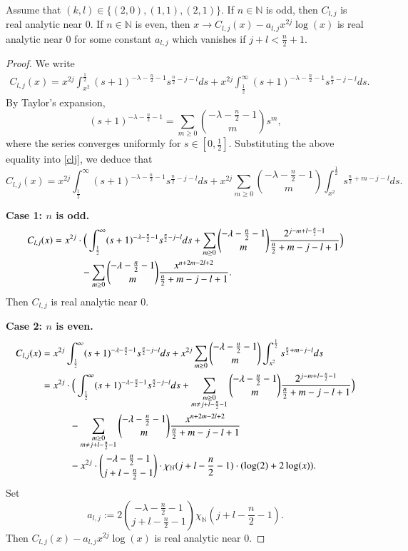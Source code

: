 \documentclass[12pt]{amsart}
\begin{document}
\begin{lemma}\label{third fkl lemma} Assume that $(k,l)\in\{(2,0),(1,1),(2,1)\}$. If $n\in\mathbb{N}$ is odd, then $C_{l,j}$ is real analytic near $0.$ If $n\in\mathbb{N}$ is even, then $x\to C_{l,j}(x)-a_{l,j}x^{2j}\log(x)$ is real analytic near $0$ for some constant $a_{l,j}$ which vanishes if $j+l<\frac{n}{2}+1.$
\end{lemma}
\begin{proof} We write
\begin{align}\label{clj}
C_{l,j}(x)=x^{2j}\int_{x^2}^{\frac12}(s+1)^{-\lambda-\frac{n}{2}-1}s^{\frac{n}{2}-j-l}ds+x^{2j}\int_{\frac12}^{\infty}(s+1)^{-\lambda-\frac{n}{2}-1}s^{\frac{n}{2}-j-l}ds.
\end{align}
By Taylor's expansion,
$$(s+1)^{-\lambda-\frac{n}{2}-1}=\sum_{m\geq0}\binom{-\lambda-\frac{n}{2}-1}{m}s^m,$$
where the series converges uniformly for $s\in[0,\frac12].$ Substituting the above equality into \eqref{clj}, we deduce that
$$C_{l,j}(x)=x^{2j}\int_{\frac12}^{\infty}(s+1)^{-\lambda-\frac{n}{2}-1}s^{\frac{n}{2}-j-l}ds+x^{2j}\sum_{m\geq0}\binom{-\lambda-\frac{n}{2}-1}{m}\int_{x^2}^{\frac12}s^{\frac{n}{2}+m-j-l}ds.$$

{\bf Case 1:  $n$ is odd.}
\begin{align*}
C_{l,j}(x)&=x^{2j}\cdot\Big( \int_{\frac12}^{\infty}(s+1)^{-\lambda-\frac{n}{2}-1}s^{\frac{n}{2}-j-l}ds+\sum_{m\geq0}\binom{-\lambda-\frac{n}{2}-1}{m}\frac{2^{j-m+l-\frac{n}{2}-1}}{\frac{n}{2}+m-j-l+1}\Big)\\
&\hspace{1.0cm}-\sum_{m\geq0}\binom{-\lambda-\frac{n}{2}-1}{m}\frac{x^{n+2m-2l+2}}{\frac{n}{2}+m-j-l+1}.
\end{align*}
Then $C_{l,j}$ is real analytic near $0.$

{\bf Case 2:  $n$ is even.}
\begin{align*}
C_{l,j}(x)&=x^{2j}\int_{\frac12}^{\infty}(s+1)^{-\lambda-\frac{n}{2}-1}s^{\frac{n}{2}-j-l}ds+x^{2j}\sum_{m\geq0}\binom{-\lambda-\frac{n}{2}-1}{m}\int_{x^2}^{\frac12}s^{\frac{n}{2}+m-j-l}ds\\
&=x^{2j}\cdot\Big( \int_{\frac12}^{\infty}(s+1)^{-\lambda-\frac{n}{2}-1}s^{\frac{n}{2}-j-l}ds+\sum_{\substack{m\geq0\\ m\neq j+l-\frac{n}{2}-1}}\binom{-\lambda-\frac{n}{2}-1}{m}\frac{2^{j-m+l-\frac{n}{2}-1}}{\frac{n}{2}+m-j-l+1}\Big)\\
&\hspace{1.0cm}-\sum_{\substack{m\geq0\\ m\neq j+l-\frac{n}{2}-1}}\binom{-\lambda-\frac{n}{2}-1}{m}\frac{x^{n+2m-2l+2}}{\frac{n}{2}+m-j-l+1}\\
&\hspace{1.0cm}-x^{2j}\cdot \binom{-\lambda-\frac{n}{2}-1}{j+l-\frac{n}{2}-1}\cdot\chi_{\mathbb{N}}(j+l-\frac{n}{2}-1)\cdot (\log(2)+2\log(x)).
\end{align*}
Set $$a_{l,j}:=2\binom{-\lambda-\frac{n}{2}-1}{j+l-\frac{n}{2}-1}\chi_{\mathbb{N}}(j+l-\frac{n}{2}-1).$$
Then $C_{l,j}(x)-a_{l,j}x^{2j}\log(x)$ is real analytic near $0.$
\end{proof}
\end{document}
